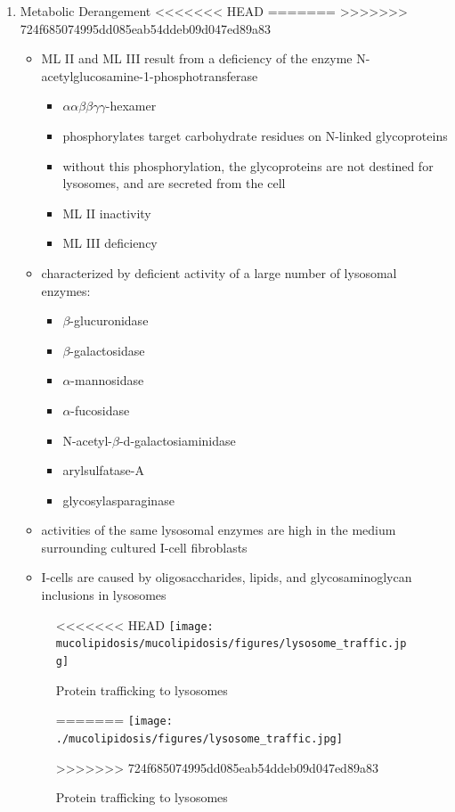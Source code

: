 \documentclass[fontsize=12pt]{scrartcl}
\begin{document}
\begin{enumerate}
\begin{enumerate}
\begin{enumerate}
\begin{enumerate}
\begin{table}[htbp]
\begin{enumerate}
\begin{enumerate}
\begin{enumerate}
\begin{enumerate}
\begin{enumerate}
\begin{enumerate}
\begin{enumerate}
\item Metabolic Derangement
<<<<<<< HEAD
\label{sec:orgeb13980}
=======
\label{sec:orgfa001d4}
>>>>>>> 724f685074995dd085eab54ddeb09d047ed89a83
\begin{itemize}
\item ML II and ML III result from a deficiency of the enzyme
N-acetylglucosamine-1-phosphotransferase
\begin{itemize}
\item \(\alpha \alpha \beta \beta \gamma \gamma\)-hexamer
\item phosphorylates target carbohydrate residues on N-linked
glycoproteins
\item without this phosphorylation, the glycoproteins are not destined
for lysosomes, and are secreted from the cell
\item{ML II} inactivity
\item{ML III} deficiency
\end{itemize}

\item characterized by deficient activity of a large number of lysosomal enzymes:
\begin{itemize}
\item \(\beta\)-glucuronidase
\item \(\beta\)-galactosidase
\item \(\alpha\)-mannosidase
\item \(\alpha\)-fucosidase
\item N-acetyl-\(\beta\)-d-galactosiaminidase
\item arylsulfatase-A
\item glycosylasparaginase
\end{itemize}
\item activities of the same lysosomal enzymes are high in the medium
surrounding cultured I-cell fibroblasts

\item I-cells are caused by oligosaccharides, lipids, and
glycosaminoglycan inclusions in lysosomes
\end{itemize}

\begin{figure}[htbp]
\centering
<<<<<<< HEAD
\texttt{[image: mucolipidosis/mucolipidosis/figures/lysosome\_traffic.jpg]}
\caption[Protein trafficking to lysosomes]{\label{fig:orgb43d2d3}Protein trafficking to lysosomes}
=======
\texttt{[image: ./mucolipidosis/figures/lysosome\_traffic.jpg]}
\caption[Protein trafficking to lysosomes]{\label{fig:orga8e8bfa}
Protein trafficking to lysosomes}
>>>>>>> 724f685074995dd085eab54ddeb09d047ed89a83
\end{figure}



\end{enumerate}
\end{enumerate}
\end{enumerate}
\end{enumerate}
\end{enumerate}
\end{enumerate}
\end{enumerate}
\end{table}
\end{enumerate}
\end{enumerate}
\end{enumerate}
\end{enumerate}
\end{document}
